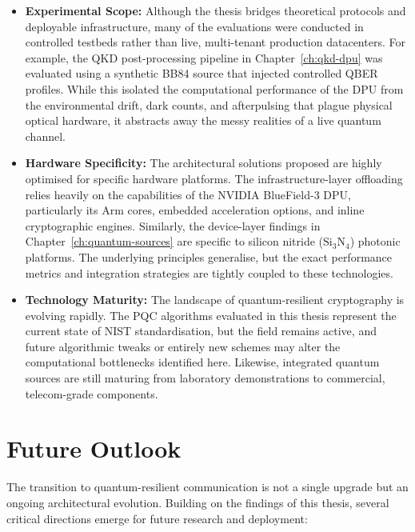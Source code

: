 \begin{itemize}
    \item \textbf{Experimental Scope:} Although the thesis bridges theoretical protocols and deployable infrastructure, many of the evaluations were conducted in controlled testbeds rather than live, multi-tenant production datacenters. For example, the QKD post-processing pipeline in Chapter~\ref{ch:qkd-dpu} was evaluated using a synthetic BB84 source that injected controlled QBER profiles. While this isolated the computational performance of the DPU from the environmental drift, dark counts, and afterpulsing that plague physical optical hardware, it abstracts away the messy realities of a live quantum channel.
    \item \textbf{Hardware Specificity:} The architectural solutions proposed are highly optimised for specific hardware platforms. The infrastructure-layer offloading relies heavily on the capabilities of the NVIDIA BlueField-3 DPU, particularly its Arm cores, embedded acceleration options, and inline cryptographic engines. Similarly, the device-layer findings in Chapter~\ref{ch:quantum-sources} are specific to silicon nitride ($\text{Si}_3\text{N}_4$) photonic platforms. The underlying principles generalise, but the exact performance metrics and integration strategies are tightly coupled to these technologies.
    \item \textbf{Technology Maturity:} The landscape of quantum-resilient cryptography is evolving rapidly. The PQC algorithms evaluated in this thesis represent the current state of NIST standardisation, but the field remains active, and future algorithmic tweaks or entirely new schemes may alter the computational bottlenecks identified here. Likewise, integrated quantum sources are still maturing from laboratory demonstrations to commercial, telecom-grade components.
\end{itemize}

\section{Future Outlook}

The transition to quantum-resilient communication is not a single upgrade but an ongoing architectural evolution. Building on the findings of this thesis, several critical directions emerge for future research and deployment:

